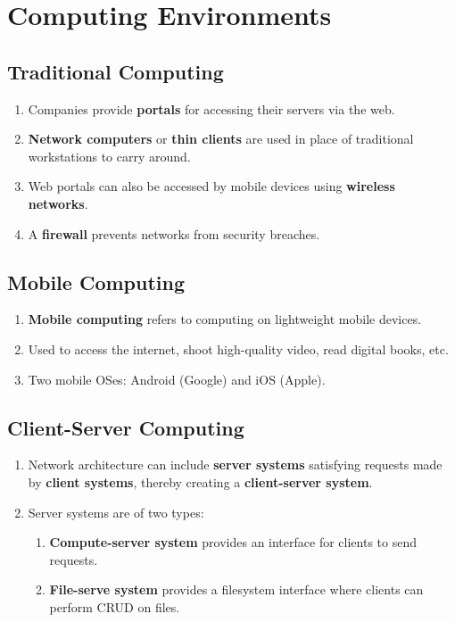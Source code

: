 \documentclass[journal,12pt,twocolumn]{IEEEtran}
\begin{document}
\section{Computing Environments}
\subsection{Traditional Computing}
\begin{enumerate}
    \item Companies provide \textbf{portals} for accessing their servers via the 
    web.
    \item \textbf{Network computers} or \textbf{thin clients} are used in place
    of traditional workstations to carry around.
    \item Web portals can also be accessed by mobile devices using
    \textbf{wireless networks}.
    \item A \textbf{firewall} prevents networks from security breaches.
\end{enumerate}

\subsection{Mobile Computing}
\begin{enumerate}
    \item \textbf{Mobile computing} refers to computing on lightweight mobile 
    devices.
    \item Used to access the internet, shoot high-quality video, read digital
    books, etc.
    \item Two mobile OSes: Android (Google) and iOS (Apple).
\end{enumerate}

\subsection{Client-Server Computing}
\begin{enumerate}
    \item Network architecture can include \textbf{server systems} satisfying 
    requests made by \textbf{client systems}, thereby creating a
    \textbf{client-server system}.
    \item Server systems are of two types:
    \begin{enumerate}
        \item \textbf{Compute-server system} provides an interface for clients 
        to send requests.
        \item \textbf{File-serve system} provides a filesystem interface where
        clients can perform CRUD on files.
    \end{enumerate}
\end{enumerate}
\end{document}
